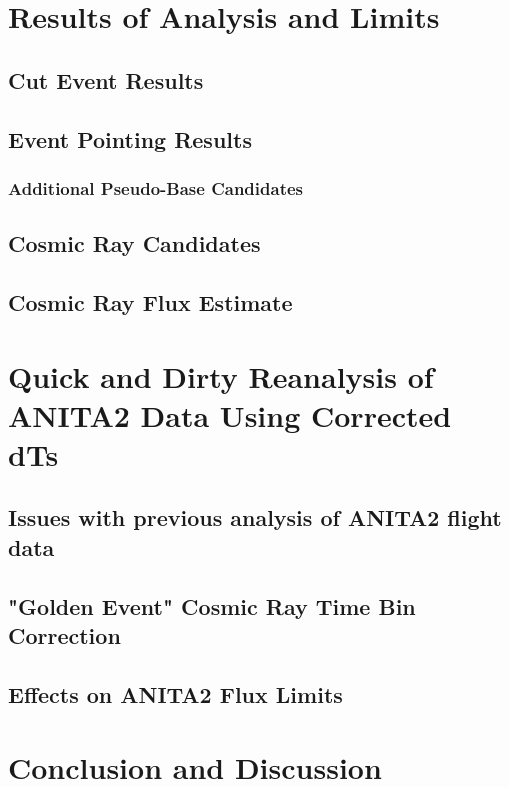 \documentclass[11pt]{uhthesis}
\begin{document}
			
\chapter{Results of Analysis and Limits}
\section{Cut Event Results}

\section{Event Pointing Results}
	\subsection{Additional Pseudo-Base Candidates}

\section{Cosmic Ray Candidates}

\section{Cosmic Ray Flux Estimate}
			
\chapter{Quick and Dirty Reanalysis of ANITA2 Data Using Corrected dTs}
\section{Issues with previous analysis of ANITA2 flight data}

\section{"Golden Event" Cosmic Ray Time Bin Correction}

\section{Effects on ANITA2 Flux Limits}
			
			
\chapter{Conclusion and Discussion}
\end{document}
